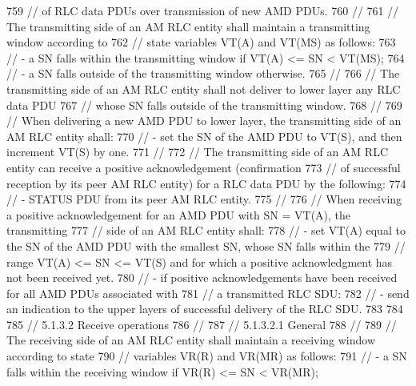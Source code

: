 \begin{DoxyCode}
759       \textcolor{comment}{// of RLC data PDUs over transmission of new AMD PDUs.}
760       \textcolor{comment}{//}
761       \textcolor{comment}{// The transmitting side of an AM RLC entity shall maintain a transmitting window according to}
762       \textcolor{comment}{// state variables VT(A) and VT(MS) as follows:}
763       \textcolor{comment}{// - a SN falls within the transmitting window if VT(A) <= SN < VT(MS);}
764       \textcolor{comment}{// - a SN falls outside of the transmitting window otherwise.}
765       \textcolor{comment}{//}
766       \textcolor{comment}{// The transmitting side of an AM RLC entity shall not deliver to lower layer any RLC data PDU}
767       \textcolor{comment}{// whose SN falls outside of the transmitting window.}
768       \textcolor{comment}{//}
769       \textcolor{comment}{// When delivering a new AMD PDU to lower layer, the transmitting side of an AM RLC entity shall:}
770       \textcolor{comment}{// - set the SN of the AMD PDU to VT(S), and then increment VT(S) by one.}
771       \textcolor{comment}{//}
772       \textcolor{comment}{// The transmitting side of an AM RLC entity can receive a positive acknowledgement (confirmation}
773       \textcolor{comment}{// of successful reception by its peer AM RLC entity) for a RLC data PDU by the following:}
774       \textcolor{comment}{// - STATUS PDU from its peer AM RLC entity.}
775       \textcolor{comment}{//}
776       \textcolor{comment}{// When receiving a positive acknowledgement for an AMD PDU with SN = VT(A), the transmitting}
777       \textcolor{comment}{// side of an AM RLC entity shall:}
778       \textcolor{comment}{// - set VT(A) equal to the SN of the AMD PDU with the smallest SN, whose SN falls within the}
779       \textcolor{comment}{//   range VT(A) <= SN <= VT(S) and for which a positive acknowledgment has not been received yet.}
780       \textcolor{comment}{// - if positive acknowledgements have been received for all AMD PDUs associated with}
781       \textcolor{comment}{//   a transmitted RLC SDU:}
782       \textcolor{comment}{// - send an indication to the upper layers of successful delivery of the RLC SDU.}
783 
784 
785       \textcolor{comment}{// 5.1.3.2 Receive operations}
786       \textcolor{comment}{//}
787       \textcolor{comment}{// 5.1.3.2.1 General}
788       \textcolor{comment}{//}
789       \textcolor{comment}{// The receiving side of an AM RLC entity shall maintain a receiving window according to state}
790       \textcolor{comment}{// variables VR(R) and VR(MR) as follows:}
791       \textcolor{comment}{// - a SN falls within the receiving window if VR(R) <= SN < VR(MR);}

\end{DoxyCode}

